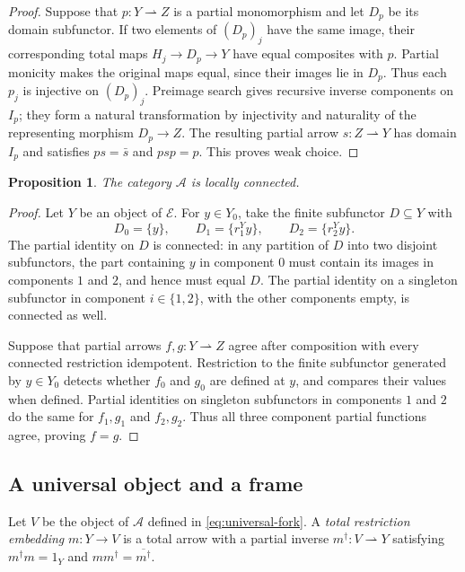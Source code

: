 \documentclass[11pt]{article}
\newtheorem{proposition}[theorem]{Proposition}
\begin{document}
\begin{proof}
Suppose that $p:Y\rightharpoonup Z$ is a partial monomorphism
and let $D_p$ be its domain subfunctor. If two elements of $(D_p)_j$
have the same image, their corresponding total maps
$H_j\to D_p\to Y$ have equal composites with $p$.
Partial monicity makes the original maps equal, since their
images lie in $D_p$. Thus each $p_j$ is injective on $(D_p)_j$.
Preimage search gives recursive inverse components on $I_p$;
they form a natural transformation by injectivity and naturality of
the representing morphism $D_p\to Z$.
The resulting partial arrow $s:Z\rightharpoonup Y$ has domain
$I_p$ and satisfies $ps=\bar s$ and $psp=p$.
This proves weak choice.
\end{proof}

\begin{proposition}\label{prop:fork-local}
The category $\mathcal A$ is locally connected.
\end{proposition}
\begin{proof}
Let $Y$ be an object of $\mathcal E$. For $y\in Y_0$, take the
finite subfunctor $D\subseteq Y$ with
\[
 D_0=\{y\},\qquad D_1=\{r_1^Yy\},\qquad D_2=\{r_2^Yy\}.
\]
The partial identity on $D$ is connected: in any partition of $D$
into two disjoint subfunctors, the part containing $y$ in component
$0$ must contain its images in components $1$ and $2$, and hence
must equal $D$. The partial identity on a singleton subfunctor
in component $i\in\{1,2\}$, with the other components empty,
is connected as well.

Suppose that partial arrows $f,g:Y\rightharpoonup Z$ agree
after composition with every connected restriction idempotent.
Restriction to the
finite subfunctor generated by $y\in Y_0$ detects whether
$f_0$ and $g_0$ are defined at $y$, and compares their values
when defined. Partial identities on singleton subfunctors in
components $1$ and $2$ do the same for $f_1,g_1$ and $f_2,g_2$.
Thus all three component partial functions agree, proving $f=g$.
\end{proof}

\subsection{A universal object and a frame}

Let $V$ be the object of $\mathcal A$ defined in
\eqref{eq:universal-fork}.
A \emph{total restriction embedding} $m:Y\to V$ is a total
arrow with a partial inverse $m^\dagger:V\rightharpoonup Y$
satisfying $m^\dagger m=1_Y$ and $mm^\dagger=\overline{m^\dagger}$.
\end{document}
